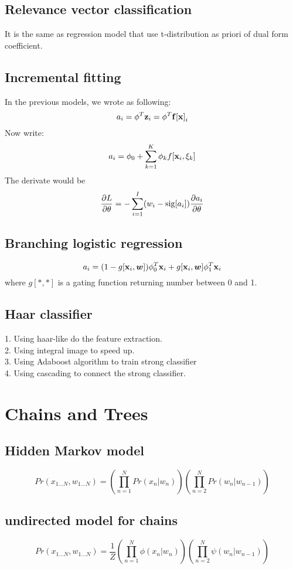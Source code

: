 \documentclass[12pt,a4paper]{article}
\begin{document}
\subsection*{Relevance vector classification}
It is the same as regression model that use t-distribution as priori of dual form coefficient.
\subsection*{Incremental fitting}
In the previous models, we wrote as following:
$$
a_i = \phi^T{\bf z}_i = \phi^T{\bf f[x]}_i
$$
Now write:
$$
a_i = \phi_0+\sum_{k=1}^{K}\phi_kf[{\bf x}_i,\xi_k]
$$
The derivate would be 
$$
\frac{\partial L}{\partial \theta} = -\sum_{i=1}^{I}(w_i-{\rm sig}[a_i])\frac{\partial a_i}{\partial \theta}
$$
\subsection*{Branching logistic regression}
$$
a_i = (1-g[{\bf x}_i,{\boldsymbol w}])\phi^T_0{\bf x}_i+g[{\bf x}_i,{\boldsymbol w}]\phi_1^T{\bf x}_i
$$
where $g[*,*]$ is a gating function returning number between 0 and 1.
\subsection*{Haar classifier}
1. Using haar-like do the feature extraction. \\
2. Using integral image to speed up.\\
3. Using Adaboost algorithm to train strong classifier\\
4. Using cascading to connect the strong classifier.
\section*{Chains and Trees}
\subsection*{Hidden Markov model}
$$
Pr(x_{1\ldots N},w_{1\ldots N}) = \left(\prod_{n=1}^{N}Pr(x_n|w_n)\right)\left(\prod_{n=2}^{N}Pr(w_n|w_{n-1})\right)
$$
\subsection*{undirected model for chains}
$$
Pr(x_{1\ldots N},w_{1\ldots N}) = \frac{1}{Z}\left(\prod_{n=1}^{N}\phi(x_n|w_n)\right)\left(\prod_{n=2}^{N}\psi(w_n|w_{n-1})\right)
$$
\end{document}
